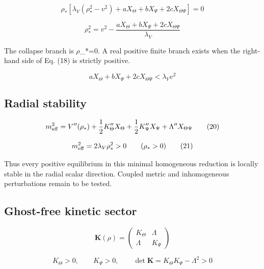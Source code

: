 \documentclass[aps,prd,preprint,nofootinbib,superscriptaddress]{revtex4-2}
\begin{document}
\begin{equation}
\rho_*\left[\lambda_V(\rho_*^2-v^2)+aX_\Theta+bX_\Psi+2cX_{\Theta\Psi}\right]=0
\tag{17}\label{eq:17}
\end{equation}

\begin{equation}
\rho_*^2=v^2-\frac{aX_\Theta+bX_\Psi+2cX_{\Theta\Psi}}{\lambda_V}
\tag{18}\label{eq:18}
\end{equation}

The collapse branch is $\rho$\_*=0. A real positive finite branch exists when the right-hand side of Eq. (18) is strictly positive.


\begin{equation}
aX_\Theta+bX_\Psi+2cX_{\Theta\Psi}<\lambda_Vv^2
\tag{19}\label{eq:19}
\end{equation}

\subsection{Radial stability}

\begin{equation}
m_{\rm eff}^2=V^{\prime\prime}(\rho_*)+\frac12K_\Theta^{\prime\prime}X_\Theta+\frac12K_\Psi^{\prime\prime}X_\Psi+\Lambda^{\prime\prime}X_{\Theta\Psi}
\tag{20}\label{eq:20}
\end{equation}

\begin{equation}
m_{\rm eff}^2=2\lambda_V\rho_*^2>0\qquad(\rho_*>0)
\tag{21}\label{eq:21}
\end{equation}

Thus every positive equilibrium in this minimal homogeneous reduction is locally stable in the radial scalar direction. Coupled metric and inhomogeneous perturbations remain to be tested.


\subsection{Ghost-free kinetic sector}

\begin{equation}
\mathbf K(\rho)=\begin{pmatrix}K_\Theta&\Lambda\\\Lambda&K_\Psi\end{pmatrix}
\tag{22}\label{eq:22}
\end{equation}

\begin{equation}
K_\Theta>0,\qquad K_\Psi>0,\qquad \det\mathbf K=K_\Theta K_\Psi-\Lambda^2>0
\tag{23}\label{eq:23}
\end{equation}
\end{document}
